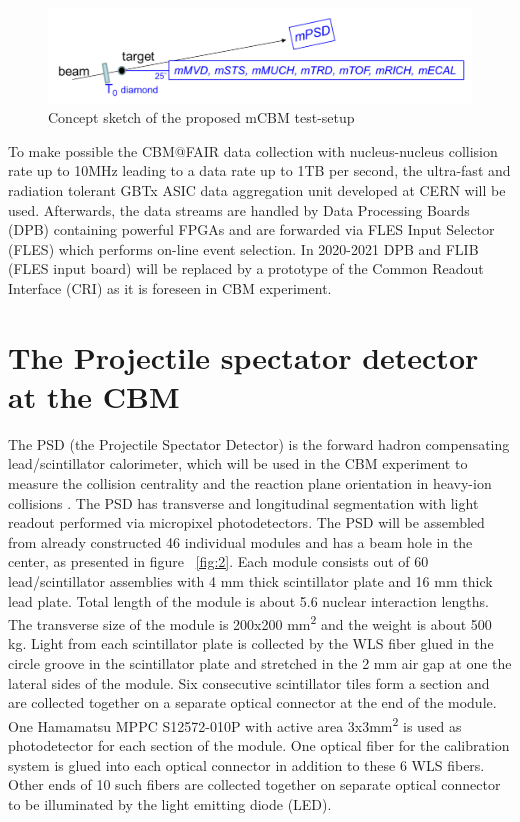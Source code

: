 \documentclass[a4paper,11pt]{article}
\begin{document}
\begin{figure}[htbp]
	\centering 
	\includegraphics[width=.8\textwidth]{mCBM_sketch.png}
	\caption{\label{fig:1} Concept sketch of the proposed mCBM test-setup}
\end{figure}

To make possible the CBM@FAIR data collection with nucleus-nucleus collision rate up to 10MHz leading to a data rate up to 1TB per second, the ultra-fast and radiation tolerant GBTx ASIC data aggregation unit developed at CERN will be used. Afterwards, the data streams are handled by Data Processing Boards (DPB) containing powerful FPGAs and are forwarded via FLES Input Selector (FLES) which performs on-line event selection. In 2020-2021 DPB and FLIB (FLES input board) will be replaced by a prototype of the Common Readout Interface (CRI) as it is foreseen in CBM experiment.


\section{The Projectile spectator detector at the CBM}
The PSD (the Projectile Spectator Detector) is the forward hadron compensating lead/scintillator calorimeter, which will be used in the CBM experiment to measure the collision centrality and the reaction plane orientation in heavy-ion collisions \cite{3}. The PSD has transverse and longitudinal segmentation with light readout performed via micropixel photodetectors. 
The PSD will be assembled from already constructed 46 individual modules and has a beam hole in the center, as presented in figure ~\ref{fig:2}. Each module consists out of 60 lead/scintillator assemblies with 4 mm thick scintillator plate and 16 mm thick lead plate. Total length of the module is about 5.6 nuclear interaction lengths. The transverse size of the module is 200x200 mm\textsuperscript{2} and the weight is about 500 kg. Light from each scintillator plate is collected by the WLS fiber glued in the circle groove in the scintillator plate and stretched in the 2 mm air gap at one the lateral sides of the module. Six consecutive scintillator tiles form a section and are collected together on a separate optical connector at the end of the module. One Hamamatsu MPPC S12572-010P with active area 3x3mm\textsuperscript{2} is used as photodetector for each section of the module. One optical fiber for the calibration system is glued into each optical connector in addition to these 6 WLS fibers. Other ends of 10 such fibers are collected together on separate optical connector to be illuminated by the light emitting diode (LED). 
\end{document}
